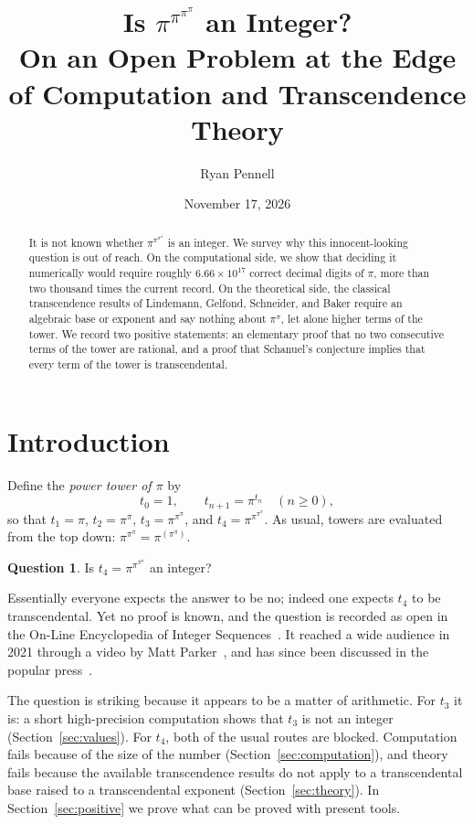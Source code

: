 \documentclass[11pt]{amsart}
\title[Is $\pi^{\pi^{\pi^{\pi}}}$ an integer?]{Is $\pi^{\pi^{\pi^{\pi}}}$ an Integer?\\ On an Open Problem at the Edge of Computation and Transcendence Theory}
\author{Ryan Pennell}
\date{November 17, 2026}
\theoremstyle{definition}
\newtheorem{question}[theorem]{Question}
\theoremstyle{remark}
\begin{document}
\begin{abstract}
It is not known whether $\pi^{\pi^{\pi^{\pi}}}$ is an integer. We survey why this innocent-looking question is out of reach. On the computational side, we show that deciding it numerically would require roughly $6.66\times10^{17}$ correct decimal digits of $\pi$, more than two thousand times the current record. On the theoretical side, the classical transcendence results of Lindemann, Gelfond, Schneider, and Baker require an algebraic base or exponent and say nothing about $\pi^{\pi}$, let alone higher terms of the tower. We record two positive statements: an elementary proof that no two consecutive terms of the tower are rational, and a proof that Schanuel's conjecture implies that every term of the tower is transcendental.
\end{abstract}

\maketitle

\section{Introduction}

Define the \emph{power tower of $\pi$} by
\[
t_0 = 1, \qquad t_{n+1} = \pi^{t_n} \quad (n \ge 0),
\]
so that $t_1 = \pi$, $t_2 = \pi^{\pi}$, $t_3 = \pi^{\pi^{\pi}}$, and $t_4 = \pi^{\pi^{\pi^{\pi}}}$. As usual, towers are evaluated from the top down: $\pi^{\pi^{\pi}} = \pi^{(\pi^{\pi})}$.

\begin{question}\label{q:main}
Is $t_4 = \pi^{\pi^{\pi^{\pi}}}$ an integer?
\end{question}

Essentially everyone expects the answer to be no; indeed one expects $t_4$ to be transcendental. Yet no proof is known, and the question is recorded as open in the On-Line Encyclopedia of Integer Sequences~\cite{oeis}. It reached a wide audience in 2021 through a video by Matt Parker~\cite{parker}, and has since been discussed in the popular press~\cite{sciam}.

The question is striking because it appears to be a matter of arithmetic. For $t_3$ it is: a short high-precision computation shows that $t_3$ is not an integer (Section~\ref{sec:values}). For $t_4$, both of the usual routes are blocked. Computation fails because of the size of the number (Section~\ref{sec:computation}), and theory fails because the available transcendence results do not apply to a transcendental base raised to a transcendental exponent (Section~\ref{sec:theory}). In Section~\ref{sec:positive} we prove what can be proved with present tools.
\end{document}
